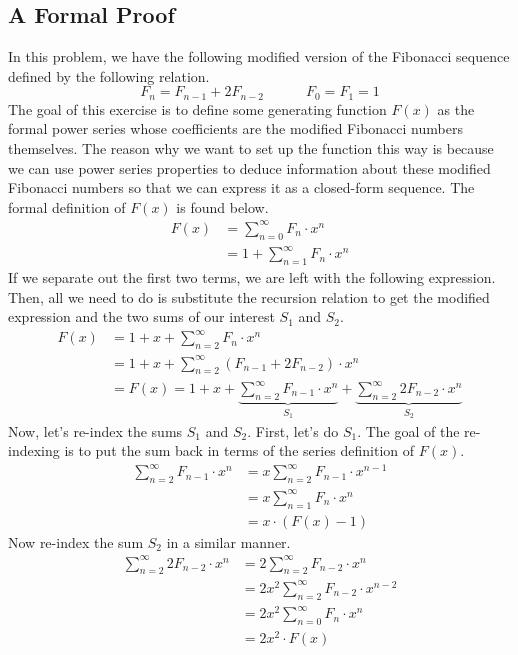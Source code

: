 \subsection{A Formal Proof}
In this problem, we have the following modified version of the Fibonacci sequence defined by the following relation.
$$
F_n = F_{n-1} + 2F_{n-2} \quad \quad \quad F_0 = F_1 = 1
$$
The goal of this exercise is to define some generating function $F(x)$ as the formal power series whose coefficients are the modified Fibonacci numbers themselves. The reason why we want to set up the function this way is because we can use power series properties to deduce information about these modified Fibonacci numbers so that we can express it as a closed-form sequence. The formal definition of $F(x)$ is found below. 
\begin{align*}
F(x) &= \sum_{n=0}^\infty F_n \cdot x^n \\
&= 1 + \sum_{n=1}^\infty F_n \cdot x^n 
\end{align*}
If we separate out the first two terms, we are left with the following expression. Then, all we need to do is substitute the recursion relation to get the modified expression and the two sums of our interest $S_1$ and $S_2$.
\begin{align*}
F(x) &= 1 + x + \sum_{n=2}^\infty F_n \cdot x^n \\
&= 1 + x + \sum_{n=2}^\infty (F_{n-1} + 2F_{n-2}) \cdot x^n\\
&= F(x) = 1 + x + \underbrace{\sum_{n=2}^\infty F_{n-1}\cdot x^n}_{S_1} + \underbrace{\sum_{n=2}^\infty 2F_{n-2}\cdot x^n}_{S_2}
\end{align*}
Now, let's re-index the sums $S_1$ and $S_2$. First, let's do $S_1$. The goal of the re-indexing is to put the sum back in terms of the series definition of $F(x)$.
\begin{align*}
    \sum_{n=2}^\infty F_{n-1} \cdot x^{n} &= x\sum_{n=2}^\infty F_{n-1} \cdot x^{n-1} \\
    &= x \sum_{n=1}^\infty F_{n}\cdot x^n \\
    &= x\cdot (F(x) - 1)
\end{align*}
Now re-index the sum $S_2$ in a similar manner.
\begin{align*}
\sum_{n=2}^\infty 2F_{n-2}\cdot x^n &= 2 \sum_{n=2}^\infty F_{n-2} \cdot x^n \\
&= 2x^2 \sum_{n=2}^\infty F_{n-2} \cdot x^{n-2} \\
&= 2x^2 \sum_{n=0}^\infty F_n \cdot x^n \\
&= 2x^2 \cdot F(x) 
\end{align*}
